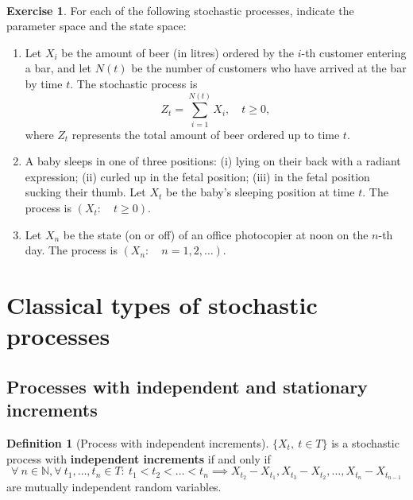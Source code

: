 \documentclass[
  11pt,
  a4paper,
]{book}
\theoremstyle{definition}
\newtheorem{definition}{Definition}[chapter]
\theoremstyle{definition}
\theoremstyle{definition}
\newtheorem{exercise}{Exercise}[chapter]
\theoremstyle{definition}
\theoremstyle{remark}
\begin{document}
\(\,\)

\begin{exercise}

For each of the following stochastic processes, indicate the parameter space and the state space:

\begin{enumerate}
\def\labelenumi{(\alph{enumi})}
\item
  Let \(X_i\) be the amount of beer (in litres) ordered by the \(i\)-th customer entering a bar, and let \(N(t)\) be the number of customers who have arrived at the bar by time \(t\). The stochastic process is
  \[
  Z_t = \sum\limits_{i=1}^{N(t)} X_i, \quad t \geq 0,
  \]
  where \(Z_t\) represents the total amount of beer ordered up to time \(t\).
\item
  A baby sleeps in one of three positions: (i) lying on their back with a radiant expression; (ii) curled up in the fetal position; (iii) in the fetal position sucking their thumb. Let \(X_t\) be the baby's sleeping position at time \(t\). The process is \((X_t: \quad t \geq 0)\).
\item
  Let \(X_n\) be the state (on or off) of an office photocopier at noon on the \(n\)-th day. The process is \((X_n: \quad n = 1, 2, \dots)\).
\end{enumerate}

\end{exercise}

\section{Classical types of stochastic processes}\label{tipos-classicos-de-processos-estocasticos}

\subsection{Processes with independent and stationary increments}\label{processos-de-incrementos-independentes-e-estacionarios}

\begin{definition}[Process with independent increments]
\(\{X_t, ~ t \in T\}\) is a stochastic process with \textbf{independent increments} if and only if
\[
\forall ~ n \in \mathbb{N}, \forall ~ t_1, \ldots, t_n \in T: ~ t_1 < t_2 < \ldots < t_n \implies X_{t_2} - X_{t_1}, X_{t_3} - X_{t_2}, \ldots, X_{t_n} - X_{t_{n-1}}
\]
are mutually independent random variables.
\end{definition}
\end{document}
